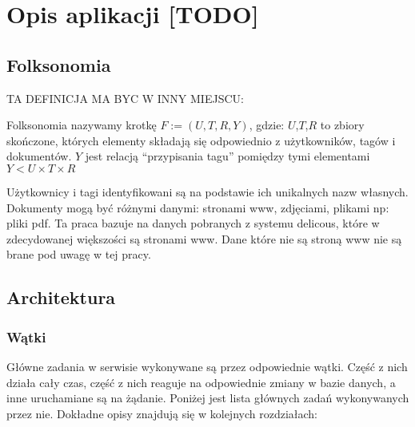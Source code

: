 \chapter{Opis aplikacji [TODO]}

\section{Folksonomia}

TA DEFINICJA MA BYC W INNY MIEJSCU: 

Folksonomia nazywamy krotkę $F := (U,T,R,Y)$, gdzie:
$U$,$T$,$R$ to zbiory skończone, których elementy składają się odpowiednio z użytkowników, tagów i dokumentów. $Y$ jest relacją “przypisania tagu” pomiędzy tymi elementami $Y < U \times T \times R$

Użytkownicy i tagi identyfikowani są na podstawie ich unikalnych nazw własnych. Dokumenty mogą być różnymi danymi: stronami www, zdjęciami, plikami np: pliki pdf. Ta praca bazuje na danych pobranych z systemu delicous, które w zdecydowanej większości są stronami www. Dane które nie są stroną www nie są brane pod uwagę w tej pracy. 

\section{Architektura}

\subsection{Wątki}

Główne zadania w serwisie wykonywane są przez odpowiednie wątki. Część z nich działa cały czas, część z nich reaguje na odpowiednie zmiany w bazie danych, a inne uruchamiane są na żądanie. Poniżej jest lista głównych zadań wykonywanych przez nie. Dokładne opisy znajdują się w kolejnych rozdziałach:

